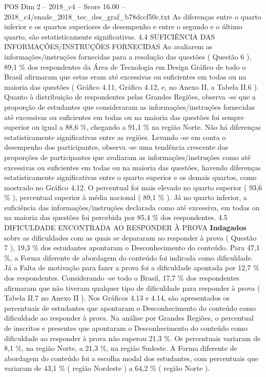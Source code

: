 \begin{textsample}{POS Dim 2 – 2018\_c4 – Score 16.00 – 2018\_c4/enade\_2018\_tec\_des\_graf\_b78dccf50c.txt}
As diferenças entre o quarto inferior e os quartos superiores de desempenho e entre o segundo e o último quarto, são estatisticamente significativas. 4.4 SUFICIÊNCIA DAS INFORMAÇÕES/INSTRUÇÕES FORNECIDAS Ao avaliarem as informações/instruções fornecidas para a resolução das questões ( Questão 6 ), 89,1 \% dos respondentes da Área de Tecnologia em Design Gráfico de todo o Brasil afirmaram que estas eram até excessivas ou suficientes em todas ou na maioria das questões ( Gráfico 4.11, Gráfico 4.12, e, no Anexo II, a Tabela II.6 ).
Quanto à distribuição de respondentes pelas Grandes Regiões, observa -se que a proporção de estudantes que consideraram as informações/instruções fornecidas até excessivas ou suficientes em todas ou na maioria das questões foi sempre superior ou igual a 88,6 \%, chegando a 91,1 \% na região Norte.
Não há diferenças estatisticamente significativas entre as regiões.
Levando -se em conta o desempenho dos participantes, observa -se uma tendência crescente das proporções de participantes que avaliaram as informações/instruções como até excessivas ou suficientes em todas ou na maioria das questões, havendo diferenças estatisticamente significativas entre o quarto superior e os demais quartos, como mostrado no Gráfico 4.12.
O percentual foi mais elevado no quarto superior ( 93,6 \% ), percentual superior à média nacional ( 89,1 \% ).
Já no quarto inferior, a suficiência das informações/instruções declarada como até excessiva, em todas ou na maioria das questões foi percebida por 85,4 \% dos respondentes. 4.5 DIFICULDADE ENCONTRADA AO RESPONDER À PROVA \textbf{Indagados} sobre as dificuldades com as quais se depararam ao responder à prova ( Questão 7 ), 19,3 \% dos estudantes apontaram o Desconhecimento do conteúdo.
Para 47,1 \%, a Forma diferente de abordagem do conteúdo foi indicada como dificuldade.
Já a Falta de motivação para fazer a prova foi a dificuldade apontada por 12,7 \% dos respondentes.
Considerando -se todo o Brasil, 17,7 \% dos respondentes afirmaram que não tiveram qualquer tipo de dificuldade para responder à prova ( Tabela II.7 no Anexo II ).
Nos Gráficos 4.13 e 4.14, são apresentados os percentuais de estudantes que apontaram o Desconhecimento do conteúdo como dificuldade ao responder à prova.
Na análise por Grandes Regiões, o percentual de inscritos e presentes que apontaram o Desconhecimento do conteúdo como dificuldade ao responder à prova não superou 21,3 \%.
Os percentuais variaram de 8,1 \%, na região Norte, a 21,3 \%, na região Sudeste.
A Forma diferente de abordagem do conteúdo foi a escolha modal dos estudantes, com percentuais que variaram de 43,1 \% ( região Nordeste ) a 64,2 \% ( região Norte ).

\end{textsample}

